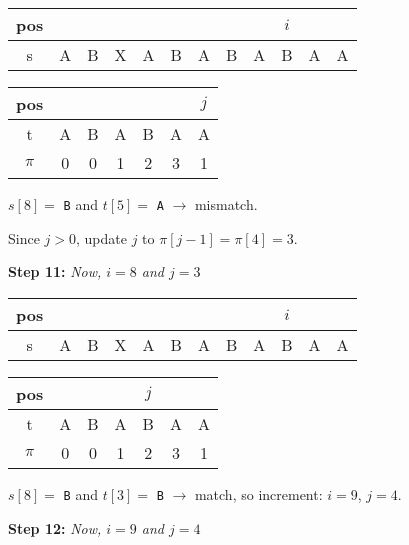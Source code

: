\begin{table}[H]
\centering
\begin{tabular}{|c|c|c|c|c|c|c|c|c|c|c|c|}
\hline
pos   &   &   &   &   &   &   &   &   &$i$&   &   \\ \hline
s     & A & B & X & A & B & A & B & A & B & A & A \\ \hline
\end{tabular}
\end{table}

\begin{table}[H]
\centering
\begin{tabular}{|c|c|c|c|c|c|c|}
\hline
pos   &   &   &   &   &   &$j$\\ \hline
t     & A & B & A & B & A & A \\ \hline
$\pi$ & 0 & 0 & 1 & 2 & 3 & 1 \\ \hline
\end{tabular}
\end{table}

$s[8] = $ \texttt{B} and $t[5] = $ \texttt{A} $\longrightarrow$ mismatch.

Since $j > 0$, update $j$ to $\pi[j - 1] = \pi[4] = 3$.

\textbf{Step 11: }\textit{Now, $i = 8$ and $j = 3$}

\begin{table}[H]
\centering
\begin{tabular}{|c|c|c|c|c|c|c|c|c|c|c|c|}
\hline
pos   &   &   &   &   &   &   &   &   &$i$&   &   \\ \hline
s     & A & B & X & A & B & A & B & A & B & A & A \\ \hline
\end{tabular}
\end{table}

\begin{table}[H]
\centering
\begin{tabular}{|c|c|c|c|c|c|c|}
\hline
pos   &   &   &   &$j$&   &   \\ \hline
t     & A & B & A & B & A & A \\ \hline
$\pi$ & 0 & 0 & 1 & 2 & 3 & 1 \\ \hline
\end{tabular}
\end{table}

$s[8] = $ \texttt{B} and $t[3] = $ \texttt{B} $\longrightarrow$ match, so increment: $i = 9$, $j = 4$.

\textbf{Step 12: }\textit{Now, $i = 9$ and $j = 4$}

